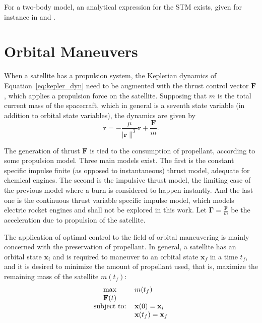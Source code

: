 For a two-body model, an analytical expression for the STM exists, given for instance in  and . 

\section{Orbital Maneuvers}
When a satellite has a propulsion system, the Keplerian dynamics of Equation~\eqref{eq:kepler_dyn} need to be augmented with the thrust control vector \(\mathbf{F}\), which applies a propulsion force on the satellite. Supposing that \(m\) is the total current mass of the spacecraft, which in general is a seventh state variable (in addition to orbital state variables), the dynamics are given by
\begin{equation}
    \ddot{\mathbf{r}} = -\frac{\mu}{\lvert \mathbf{r} \rVert^3}\mathbf{r} + \frac{\mathbf{F}}{m}.
\end{equation}

The generation of thrust \(\mathbf{F}\) is tied to the consumption of propellant, according to some propulsion model. Three main models exist. The first is the constant specific impulse finite (as opposed to instantaneous) thrust model, adequate for chemical engines. The second is the impulsive thrust model, the limiting case of the previous model where a burn is considered to happen instantly. And the last one is the continuous thrust variable specific impulse model, which models electric rocket engines and shall not be explored in this work. Let \(\boldsymbol{\Gamma} = \frac{\mathbf{F}}{m}\) be the acceleration due to propulsion of the satellite.

The application of optimal control to the field of orbital maneuvering is mainly concerned with the preservation of propellant. In general, a satellite has an orbital state \(\mathbf{x}_i\) and is required to maneuver to an orbital state \(\mathbf{x}_f\) in a time \(t_f\), and it is desired to minimize the amount of propellant used, that is, maximize the remaining mass of the satellite \(m(t_f)\):
\begin{align}\label{eq:orb_man_obj}
    \begin{tabular}{cl}
     $\max$ & $m(t_f)$\\
         $\mathbf{F}(t)$ &  \\
          subject to: &$\x(0) = \x_i$\\
                      & $\x(t_f) = \x_f$
    \end{tabular}
 \end{align}


